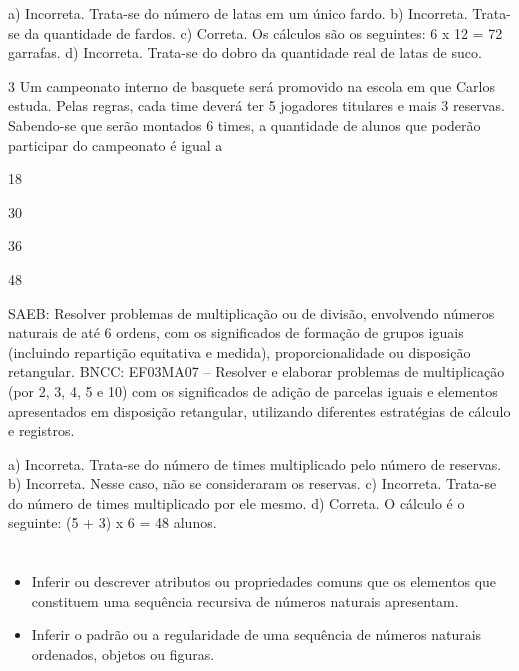 \begin{escolha}
a) Incorreta. Trata-se do número de latas em um único fardo.
b) Incorreta. Trata-se da quantidade de fardos.
c) Correta. Os cálculos são os seguintes: 6 x 12 = 72 garrafas.
d) Incorreta. Trata-se do dobro da quantidade real de latas de suco.



\num{3} Um campeonato interno de basquete será promovido na escola em que Carlos
estuda. Pelas regras, cada time deverá ter 5 jogadores titulares e mais 3 reservas. Sabendo-se que serão montados 6 times, a quantidade de alunos
que poderão participar do campeonato é igual a

\begin{escolha}

\item
  18
\item
  30
\item
  36
\item
  48
\end{escolha}

SAEB: Resolver problemas de multiplicação ou de divisão, envolvendo números naturais de até 6 ordens, com os significados de formação de grupos iguais (incluindo repartição equitativa e medida), proporcionalidade ou disposição retangular.
BNCC: EF03MA07 – Resolver e elaborar problemas de multiplicação (por 2, 3, 4, 5 e 10) com os
significados de adição de parcelas iguais e elementos apresentados em disposição retangular,
utilizando diferentes estratégias de cálculo e registros.

a) Incorreta. Trata-se do número de times multiplicado pelo número de reservas.
b) Incorreta. Nesse caso, não se consideraram os reservas.
c) Incorreta. Trata-se do número de times multiplicado por ele mesmo.
d) Correta. O cálculo é o seguinte: (5 + 3) x 6 = 48 alunos.

\chapter{}


\begin{itemize}
    \item Inferir ou descrever atributos ou propriedades comuns que os elementos
que constituem uma sequência recursiva de números naturais apresentam.

    \item Inferir o padrão ou a regularidade de uma sequência de números
naturais ordenados, objetos ou figuras.


\end{itemize}
\end{escolha}
